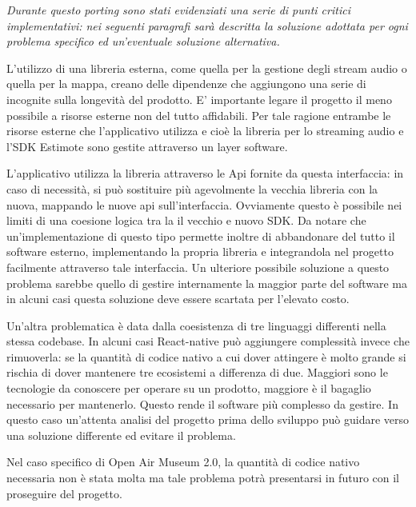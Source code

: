 \emph{Durante questo porting sono stati evidenziati una serie di punti critici implementativi: nei seguenti paragrafi sarà descritta la soluzione adottata per ogni problema specifico ed un'eventuale soluzione alternativa.}\vspace{5mm}

L’utilizzo di una libreria esterna, come quella per la gestione degli stream audio o quella per la mappa, creano delle dipendenze che aggiungono una serie di incognite sulla longevità del prodotto. E’ importante legare il progetto il meno possibile a risorse esterne non del tutto affidabili. Per tale ragione entrambe le risorse esterne che l’applicativo utilizza e cioè la libreria per lo streaming audio e l’SDK Estimote sono gestite attraverso un layer software.\vspace{5mm}

 L’applicativo utilizza la libreria attraverso le Api fornite da questa interfaccia: in caso di necessità, si può sostituire più agevolmente la vecchia libreria con la nuova, mappando le nuove api sull’interfaccia. Ovviamente questo è possibile nei limiti di una coesione logica tra la il vecchio e nuovo SDK. Da notare che un'implementazione di questo tipo permette inoltre di abbandonare del tutto il software esterno, implementando la propria libreria e integrandola nel progetto facilmente attraverso tale interfaccia. Un ulteriore possibile soluzione a questo problema sarebbe quello di gestire internamente la maggior parte del software ma in alcuni casi questa soluzione deve essere scartata per l’elevato costo.\vspace{5mm}

Un'altra problematica è data dalla coesistenza di tre linguaggi differenti nella stessa codebase. In alcuni casi React-native può aggiungere complessità invece che rimuoverla: se la quantità di codice nativo a cui dover attingere è molto grande si rischia di dover mantenere tre ecosistemi a differenza di due. Maggiori sono le tecnologie da conoscere per operare su un prodotto, maggiore è il bagaglio necessario per mantenerlo. Questo rende il software più complesso da gestire. In questo caso un'attenta analisi del progetto prima dello sviluppo può guidare verso una soluzione differente ed evitare il problema.\vspace{5mm}

 Nel caso specifico di Open Air Museum 2.0, la quantità di codice nativo necessaria non è stata molta ma tale problema potrà presentarsi in futuro con il proseguire del progetto.\vspace{5mm}

